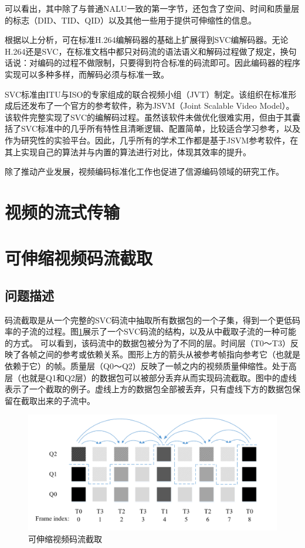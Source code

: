 可以看出，其中除了与普通NALU一致的第一字节，还包含了空间、时间和质量层的标志（DID、TID、QID）以及其他一些用于提供可伸缩性的信息。

根据以上分析，可在标准H.264编解码器的基础上扩展得到SVC编解码器。无论H.264还是SVC，在标准文档中都只对码流的语法语义和解码过程做了规定，换句话说：对编码的过程不做限制，只要得到符合标准的码流即可。因此编码器的程序实现可以多种多样，而解码必须与标准一致。
 
SVC标准由ITU与ISO的专家组成的联合视频小组（JVT）制定。该组织在标准形成后还发布了一个官方的参考软件，称为JSVM（Joint Scalable Video Model）\supercite{JSVM}。该软件完整实现了SVC的编解码过程。虽然该软件未做优化很难实用，但由于其囊括了SVC标准中的几乎所有特性且清晰逻辑、配置简单，比较适合学习参考，以及作为研究性的实验平台。因此，几乎所有的学术工作都是基于JSVM参考软件，在其上实现自己的算法并与内置的算法进行对比，体现其效率的提升。

除了推动产业发展，视频编码标准化工作也促进了信源编码领域的研究工作。

\section{视频的流式传输}

\section{可伸缩视频码流截取}

\subsection{问题描述}

码流截取是从一个完整的SVC码流中抽取所有数据包的一个子集，得到一个更低码率的子流的过程。图\ref{fig:Bitstream-Extraction}展示了一个SVC码流的结构，以及从中截取子流的一种可能的方式。
可以看到，该码流中的数据包被分为了不同的层。时间层（T0～T3）反映了各帧之间的参考或依赖关系。图形上方的箭头从被参考帧指向参考它（也就是依赖于它）的帧。质量层（Q0～Q2）反映了一帧之内的视频质量伸缩性。处于高层（也就是Q1和Q2层）的数据包可以被部分丢弃从而实现码流截取。图中的虚线表示了一个截取的例子。虚线上方的数据包全部被丢弃，只有虚线下方的数据包保留在截取出来的子流中。

\begin{figure}[h]
\centering
\includegraphics[width = 0.9\linewidth]{./figures/Bitstream-Extraction.jpg}
\caption{可伸缩视频码流截取 \label{fig:Bitstream-Extraction}}
\end{figure}

